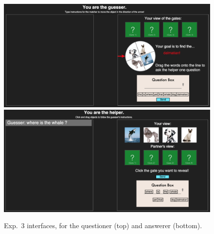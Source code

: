 \documentclass[12pt, floatsintext, jou]{apa6}
\begin{document}
	\begin{figure}[t!]
\begin{center}
\includegraphics[scale = .3]{Exp3GuesserView}
\includegraphics[scale = .3]{Exp3HelperView}
\end{center}
\caption{Exp.~3 interfaces, for the questioner (top) and answerer (bottom).}
\label{fig:exp3views}
\end{figure}
%
%
\end{document}
